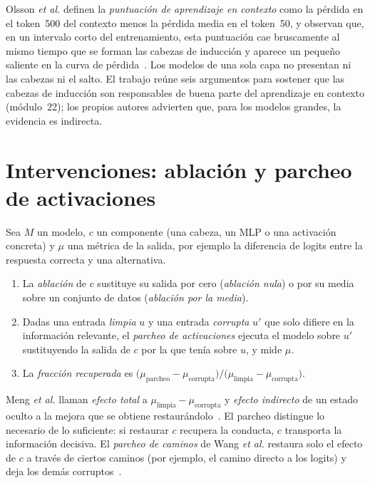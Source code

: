 Olsson \emph{et al.} definen la \emph{puntuación de aprendizaje en contexto} como la pérdida en el token~500 del contexto menos la pérdida media en el token~50, y observan que, en un intervalo corto del entrenamiento, esta puntuación cae bruscamente al mismo tiempo que se forman las cabezas de inducción y aparece un pequeño saliente en la curva de pérdida~\cite{olsson}. Los modelos de una sola capa no presentan ni las cabezas ni el salto. El trabajo reúne seis argumentos para sostener que las cabezas de inducción son responsables de buena parte del aprendizaje en contexto (módulo~22); los propios autores advierten que, para los modelos grandes, la evidencia es indirecta.

\section{Intervenciones: ablación y parcheo de activaciones}

\begin{definicion}\label{def:parcheo}
Sea $M$ un modelo, $c$ un componente (una cabeza, un MLP o una activación concreta) y $\mu$ una métrica de la salida, por ejemplo la diferencia de logits entre la respuesta correcta y una alternativa.
\begin{enumerate}
  \item La \emph{ablación} de $c$ sustituye su salida por cero (\emph{ablación nula}) o por su media sobre un conjunto de datos (\emph{ablación por la media}).
  \item Dadas una entrada \emph{limpia} $u$ y una entrada \emph{corrupta} $u'$ que solo difiere en la información relevante, el \emph{parcheo de activaciones} ejecuta el modelo sobre $u'$ sustituyendo la salida de $c$ por la que tenía sobre $u$, y mide $\mu$.
  \item La \emph{fracción recuperada} es $\bigl(\mu_{\mathrm{parcheo}}-\mu_{\mathrm{corrupta}}\bigr)/\bigl(\mu_{\mathrm{limpia}}-\mu_{\mathrm{corrupta}}\bigr)$.
\end{enumerate}
\end{definicion}

Meng \emph{et al.} llaman \emph{efecto total} a $\mu_{\mathrm{limpia}}-\mu_{\mathrm{corrupta}}$ y \emph{efecto indirecto} de un estado oculto a la mejora que se obtiene restaurándolo~\cite[§2.1]{meng}. El parcheo distingue lo necesario de lo suficiente: si restaurar $c$ recupera la conducta, $c$ transporta la información decisiva. El \emph{parcheo de caminos} de Wang \emph{et al.} restaura solo el efecto de $c$ a través de ciertos caminos (por ejemplo, el camino directo a los logits) y deja los demás corruptos~\cite[§3.1]{wang-ioi}.

